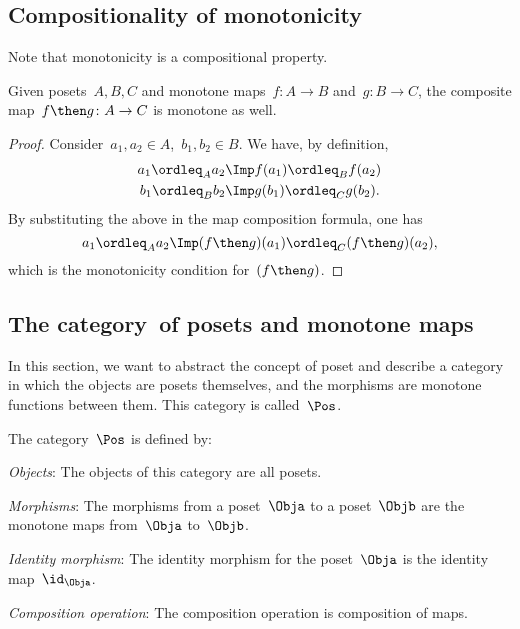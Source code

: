 \subsection{Compositionality of monotonicity}
Note that monotonicity is a compositional property.
\begin{lemma}
Given  posets~$A, B, C$ and monotone maps~$f\colon A \to B$ and~$g\colon B \to C$, the composite map~$f\then g\colon  A \to C$ is
monotone as well.
\end{lemma}
\begin{proof}
Consider~$a_1,a_2 \in A$,~$b_1,b_2\in B$. We have, by definition, 
\begin{equation}
\begin{aligned}
        a_1\ordleq_A a_2 &\Imp f(a_1)\ordleq_B f(a_2)\\ 
        b_1\ordleq_B b_2 &\Imp g(b_1)\ordleq_C g(b_2).
\end{aligned}
\end{equation}
By substituting the above in the map composition formula, one has
\begin{equation}
    a_1\ordleq_A a_2 \Imp (f\then g)(a_1) \ordleq_C (f\then g)(a_2),
\end{equation}
which is the monotonicity condition for~$(f\then g)$.
\end{proof}

\subsection{The category~\Pos of posets and monotone maps}
In this section, we want to abstract the concept of poset and describe a category in which the objects are posets themselves, and the morphisms are monotone functions between them. This category is called~$\Pos$.

\begin{definition}
    The category~$\Pos$ is defined by:
    \begin{compactenum}
    \item \emph{Objects}: The objects of this category are all posets.
    \item \emph{Morphisms}: The morphisms from a poset~$\Obja$ to a poset~$\Objb$ are the monotone maps from~$\Obja$ to~$\Objb$.
    \item \emph{Identity morphism}:  The identity morphism for the poset~$\Obja$
    is the identity map~$\id_\Obja$.
    \item \emph{Composition operation}: The composition operation is composition of maps.
    \end{compactenum}
\end{definition}

